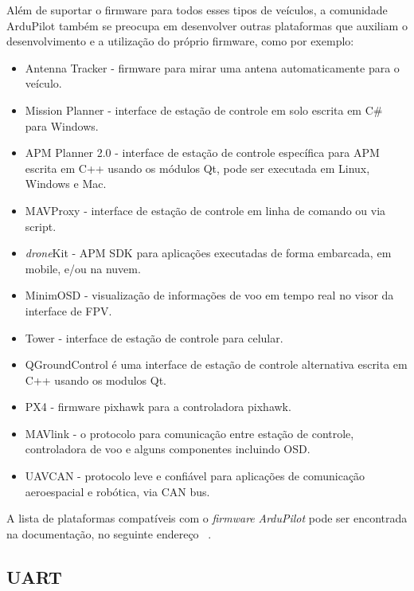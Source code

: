 \documentclass[12pt,a4paper,oneside]{book}
\begin{document}
Além de suportar o firmware para todos esses tipos de veículos, a comunidade ArduPilot também se preocupa em desenvolver outras plataformas que auxiliam o desenvolvimento e a utilização do próprio firmware, como por exemplo:

\begin{itemize}
  \item Antenna Tracker - firmware para mirar uma antena automaticamente para o veículo.

  \item Mission Planner - interface de estação de controle em solo escrita em C\# para Windows.
  
  \item APM Planner 2.0 - interface de estação de controle específica para APM escrita em C++ usando os módulos Qt, pode ser executada em Linux, Windows e Mac.
  
  \item MAVProxy - interface de estação de controle em linha de comando ou via script.
  
  \item \textit{drone}Kit - APM SDK para aplicações executadas de forma embarcada, em mobile, e/ou na nuvem.
  
  \item MinimOSD - visualização de informações de voo em tempo real no visor da interface de FPV.
  \item Tower - interface de estação de controle para celular.  
  \item QGroundControl é uma interface de estação de controle alternativa escrita em C++ usando os modulos Qt.
  \item PX4 - firmware pixhawk para a controladora pixhawk.
  
  \item MAVlink - o protocolo para comunicação entre estação de controle, controladora de voo e alguns componentes incluindo OSD.
  
  \item UAVCAN - protocolo leve e confiável para aplicações de comunicação aeroespacial e robótica, via CAN bus. 
  
\end{itemize}

A lista de plataformas compatíveis com o \textit{firmware} \textit{ArduPilot} pode ser encontrada na documentação, no seguinte endereço ~\cite{url:ardupilotdoc}. 


\subsection{UART}
\end{document}

